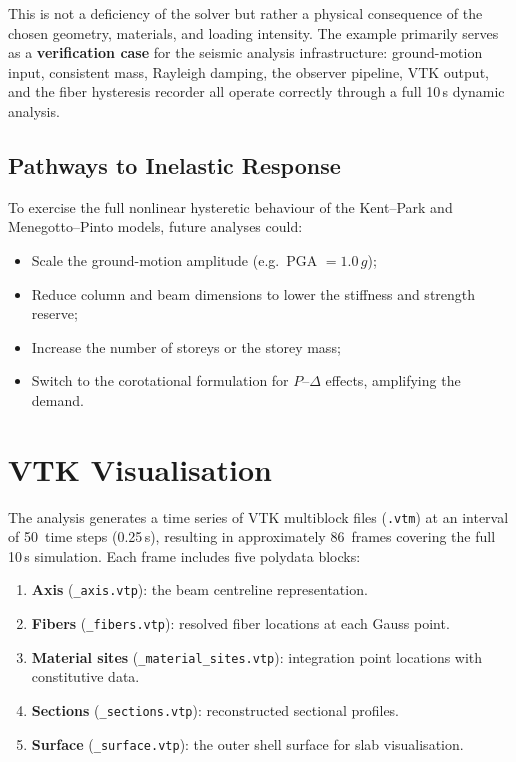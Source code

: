 This is not a deficiency of the solver but rather a physical consequence
of the chosen geometry, materials, and loading intensity.  The example
primarily serves as a \textbf{verification case} for the seismic
analysis infrastructure: ground-motion input, consistent mass,
Rayleigh damping, the observer pipeline, VTK output, and the fiber
hysteresis recorder all operate correctly through a full 10\,s dynamic
analysis.

\subsection{Pathways to Inelastic Response}

To exercise the full nonlinear hysteretic behaviour of the
Kent--Park and Menegotto--Pinto models, future analyses could:
%
\begin{itemize}[nosep]
  \item Scale the ground-motion amplitude (e.g.\ PGA $= 1.0\,g$);
  \item Reduce column and beam dimensions to lower the stiffness and
        strength reserve;
  \item Increase the number of storeys or the storey mass;
  \item Switch to the corotational formulation for $P$--$\Delta$ effects,
        amplifying the demand.
\end{itemize}


\section{VTK Visualisation}
\label{sec:seismic-rc-vtk}

The analysis generates a time series of VTK multiblock files
(\texttt{.vtm}) at an interval of 50~time steps (0.25\,s), resulting
in approximately 86~frames covering the full 10\,s simulation.  Each
frame includes five polydata blocks:
%
\begin{enumerate}[nosep]
  \item \textbf{Axis} (\texttt{\_axis.vtp}): the beam centreline
        representation.
  \item \textbf{Fibers} (\texttt{\_fibers.vtp}): resolved fiber
        locations at each Gauss point.
  \item \textbf{Material sites} (\texttt{\_material\_sites.vtp}):
        integration point locations with constitutive data.
  \item \textbf{Sections} (\texttt{\_sections.vtp}): reconstructed
        sectional profiles.
  \item \textbf{Surface} (\texttt{\_surface.vtp}): the outer shell
        surface for slab visualisation.
\end{enumerate}

